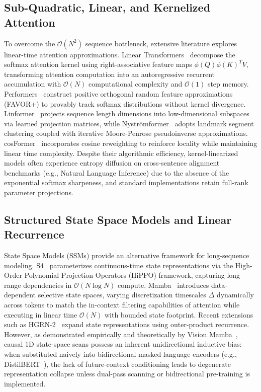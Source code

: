 \subsection{Sub-Quadratic, Linear, and Kernelized Attention}
To overcome the $\mathcal{O}(N^2)$ sequence bottleneck, extensive literature explores linear-time attention approximations. Linear Transformers~\cite{katharopoulos2020transformers} decompose the softmax attention kernel using right-associative feature maps $\phi(Q)\phi(K)^T V$, transforming attention computation into an autoregressive recurrent accumulation with $\mathcal{O}(N)$ computational complexity and $\mathcal{O}(1)$ step memory. Performers~\cite{choromanski2021rethinking} construct positive orthogonal random feature approximations (FAVOR+) to provably track softmax distributions without kernel divergence. Linformer~\cite{wang2020linformer} projects sequence length dimensions into low-dimensional subspaces via learned projection matrices, while Nystr\"omformer~\cite{xiong2021nystromformer} adopts landmark segment clustering coupled with iterative Moore-Penrose pseudoinverse approximations. cosFormer~\cite{qin2022cosformer} incorporates cosine reweighting to reinforce locality while maintaining linear time complexity. Despite their algorithmic efficiency, kernel-linearized models often experience entropy diffusion on cross-sentence alignment benchmarks (e.g., Natural Language Inference) due to the absence of the exponential softmax sharpeness, and standard implementations retain full-rank parameter projections.

\subsection{Structured State Space Models and Linear Recurrence}
State Space Models (SSMs) provide an alternative framework for long-sequence modeling. S4~\cite{gu2022efficiently} parameterizes continuous-time state representations via the High-Order Polynomial Projection Operators (HiPPO) framework, capturing long-range dependencies in $\mathcal{O}(N \log N)$ compute. Mamba~\cite{gu2023mamba} introduces data-dependent selective state spaces, varying discretization timescales $\Delta$ dynamically across tokens to match the in-context filtering capabilities of attention while executing in linear time $\mathcal{O}(N)$ with bounded state footprint. Recent extensions such as HGRN-2~\cite{qin2024hgrn2} expand state representations using outer-product recurrence. However, as demonstrated empirically and theoretically by Vision Mamba~\cite{zhu2024visionmamba}, causal 1D state-space scans possess an inherent unidirectional inductive bias: when substituted naively into bidirectional masked language encoders (e.g., DistilBERT~\cite{sanh2019distilbert}), the lack of future-context conditioning leads to degenerate representation collapse unless dual-pass scanning or bidirectional pre-training is implemented.

